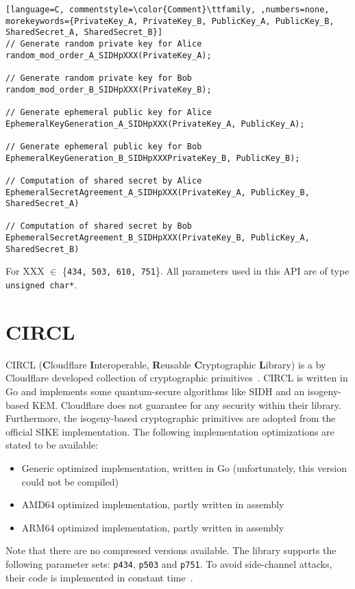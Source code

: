 \begin{lstlisting}[language=C, commentstyle=\color{Comment}\ttfamily, ,numbers=none, morekeywords={PrivateKey_A, PrivateKey_B, PublicKey_A, PublicKey_B, SharedSecret_A, SharedSecret_B}]
// Generate random private key for Alice
random_mod_order_A_SIDHpXXX(PrivateKey_A);

// Generate random private key for Bob
random_mod_order_B_SIDHpXXX(PrivateKey_B);

// Generate ephemeral public key for Alice
EphemeralKeyGeneration_A_SIDHpXXX(PrivateKey_A, PublicKey_A);

// Generate ephemeral public key for Bob
EphemeralKeyGeneration_B_SIDHpXXXPrivateKey_B, PublicKey_B);

// Computation of shared secret by Alice
EphemeralSecretAgreement_A_SIDHpXXX(PrivateKey_A, PublicKey_B, SharedSecret_A)

// Computation of shared secret by Bob
EphemeralSecretAgreement_B_SIDHpXXX(PrivateKey_B, PublicKey_A, SharedSecret_B)

\end{lstlisting}
For XXX $\in$ \{\texttt{434, 503, 610, 751}\}. All parameters used in this API are of type \texttt{unsigned char*}.

\section{CIRCL}

CIRCL (\textbf{C}loudflare \textbf{I}nteroperable, \textbf{R}eusable \textbf{C}ryptographic \textbf{L}ibrary) is a by Cloudflare developed collection of cryptographic primitives~\parencite{circl2020github}. CIRCL is written in Go and implements some quantum-secure algorithms like SIDH and an isogeny-based KEM. Cloudflare does not guarantee for any security within their library. Furthermore, the isogeny-based cryptographic primitives are adopted from the official SIKE implementation. The following implementation optimizations are stated to be available:

\begin{itemize}
  \item Generic optimized implementation, written in Go (unfortunately, this version could not be compiled)
  \item AMD64 optimized implementation, partly written in assembly
  \item ARM64 optimized implementation, partly written in assembly
\end{itemize}
Note that there are no compressed versions available. The library supports the following parameter sets: \texttt{p434}, \texttt{p503} and \texttt{p751}. To avoid side-channel attacks, their code is implemented in constant time~\parencite{circl2019intro}.

